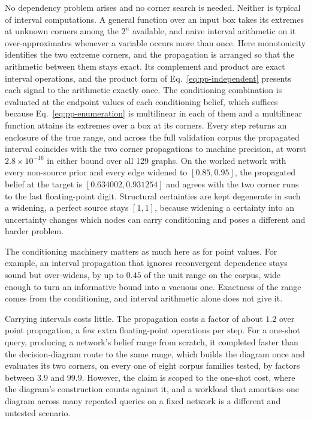 \documentclass[12pt]{report}
\begin{document}
No dependency problem arises and no corner search is needed. Neither is typical of interval computations. A general function over an input box takes its extremes at unknown corners among the $2^n$ available, and naive interval arithmetic on it over-approximates whenever a variable occurs more than once. Here monotonicity identifies the two extreme corners, and the propagation is arranged so that the arithmetic between them stays exact. Its complement and product are exact interval operations, and the product form of Eq.~\eqref{eq:pp-independent} presents each signal to the arithmetic exactly once. The conditioning combination is evaluated at the endpoint values of each conditioning belief, which suffices because Eq.~\eqref{eq:pp-enumeration} is multilinear in each of them and a multilinear function attains its extremes over a box at its corners. Every step returns an enclosure of the true range, and across the full validation corpus the propagated interval coincides with the two corner propagations to machine precision, at worst $2.8 \times 10^{-16}$ in either bound over all 129 graphs. On the worked network with every non-source prior and every edge widened to $[0.85, 0.95]$, the propagated belief at the target is $[0.634002, 0.931254]$ and agrees with the two corner runs to the last floating-point digit. Structural certainties are kept degenerate in such a widening, a perfect source stays $[1,1]$, because widening a certainty into an uncertainty changes which nodes can carry conditioning and poses a different and harder problem.

The conditioning machinery matters as much here as for point values. For example, an interval propagation that ignores reconvergent dependence stays sound but over-widens, by up to $0.45$ of the unit range on the corpus, wide enough to turn an informative bound into a vacuous one. Exactness of the range comes from the conditioning, and interval arithmetic alone does not give it.

Carrying intervals costs little. The propagation costs a factor of about $1.2$ over point propagation, a few extra floating-point operations per step. For a one-shot query, producing a network's belief range from scratch, it completed faster than the decision-diagram route to the same range, which builds the diagram once and evaluates its two corners, on every one of eight corpus families tested, by factors between $3.9$ and $99.9$. However, the claim is scoped to the one-shot cost, where the diagram's construction counts against it, and a workload that amortises one diagram across many repeated queries on a fixed network is a different and untested scenario.
\end{document}
